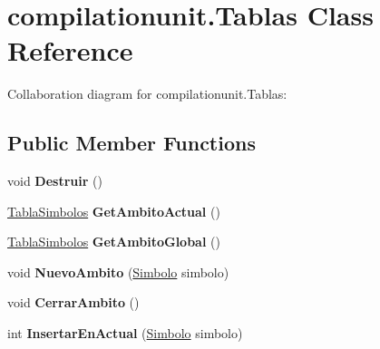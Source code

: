 \hypertarget{classcompilationunit_1_1_tablas}{
\section{compilationunit.Tablas Class Reference}
\label{classcompilationunit_1_1_tablas}
}


Collaboration diagram for compilationunit.Tablas:
\subsection*{Public Member Functions}
\begin{DoxyCompactItemize}
\item 
\hypertarget{classcompilationunit_1_1_tablas_a04dc1a0224f42b659053c7a9e6d09e96}{
void {\bfseries Destruir} ()}
\label{classcompilationunit_1_1_tablas_a04dc1a0224f42b659053c7a9e6d09e96}

\item 
\hypertarget{classcompilationunit_1_1_tablas_a892cd1103eabce4d1e121d2b4e1130e4}{
\hyperlink{classcompilationunit_1_1_tabla_simbolos}{TablaSimbolos} {\bfseries GetAmbitoActual} ()}
\label{classcompilationunit_1_1_tablas_a892cd1103eabce4d1e121d2b4e1130e4}

\item 
\hypertarget{classcompilationunit_1_1_tablas_a0aafb8af97bd165586540636d8b93b82}{
\hyperlink{classcompilationunit_1_1_tabla_simbolos}{TablaSimbolos} {\bfseries GetAmbitoGlobal} ()}
\label{classcompilationunit_1_1_tablas_a0aafb8af97bd165586540636d8b93b82}

\item 
\hypertarget{classcompilationunit_1_1_tablas_a9a55de53156f13afc16439944c90fd4d}{
void {\bfseries NuevoAmbito} (\hyperlink{classcompilationunit_1_1_simbolo}{Simbolo} simbolo)}
\label{classcompilationunit_1_1_tablas_a9a55de53156f13afc16439944c90fd4d}

\item 
\hypertarget{classcompilationunit_1_1_tablas_acfac422799fa19774bed3bc25a6df918}{
void {\bfseries CerrarAmbito} ()}
\label{classcompilationunit_1_1_tablas_acfac422799fa19774bed3bc25a6df918}

\item 
\hypertarget{classcompilationunit_1_1_tablas_aa34f2bb9225682ccc4a93baac0b71152}{
int {\bfseries InsertarEnActual} (\hyperlink{classcompilationunit_1_1_simbolo}{Simbolo} simbolo)}
\label{classcompilationunit_1_1_tablas_aa34f2bb9225682ccc4a93baac0b71152}


\end{DoxyCompactItemize}
